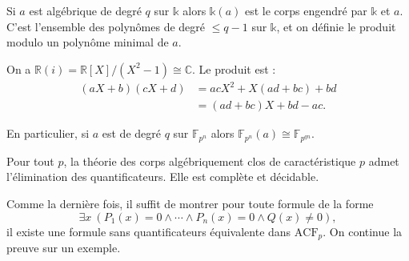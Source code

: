 \documentclass[./main]{subfiles}
\begin{document}
  \begin{rmk}
    Si $a$ est algébrique de degré $q$ sur $\mathds{k}$ alors $\mathds{k}(a)$ est le corps engendré par $\mathds{k}$ et $a$.
    C'est l'ensemble des polynômes de degré $\le q-1$ sur $\mathds{k}$, et on définie le produit modulo un polynôme minimal de $a$.
  \end{rmk}

  \begin{exm}
    On a $\mathds{R}(i) = \mathds{R}[X] / (X^2 - 1) \cong \mathds{C}$.
    Le produit est :
    \begin{align*}
      (aX + b)(c X + d)
      &= ac X^2 + X(ad + bc) + bd \\
      &= (ad + bc) X + bd - ac
    .\end{align*}

    En particulier, si $a$ est de degré $q$ sur $\mathds{F}_{p^n}$ alors $\mathds{F}_{p^n}(a) \cong \mathds{F}_{p^{qn}}$.
  \end{exm}

  \begin{thm}
    Pour tout $p$, la théorie des corps algébriquement clos de caractéristique $p$ admet l'élimination des quantificateurs. Elle est complète et décidable.
  \end{thm}
  \begin{prv}
    Comme la dernière fois, il suffit de montrer pour toute formule de la forme \[
      \exists x \: (P_1(x) = 0 \land \cdots \land P_n(x) = 0 \land Q(x) \neq 0)
    ,\]
    il existe une formule sans quantificateurs équivalente dans $\mathrm{ACF}_p$.
    On continue la preuve sur un exemple.
  \end{prv}
\end{document}

